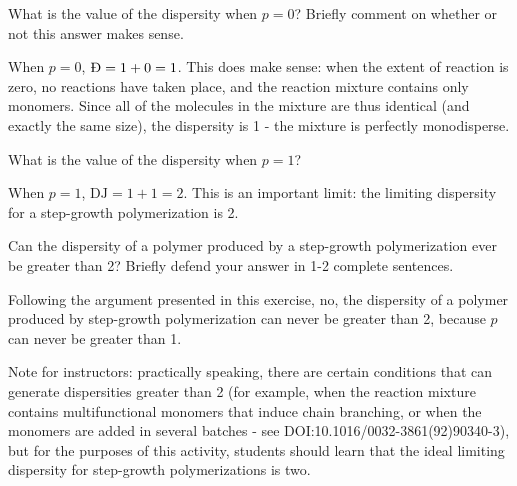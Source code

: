 \begin{activity}
\begin{ctqs}
			
		\question What is the value of the dispersity when $p=0$?  Briefly comment on whether or not this answer makes sense.
		
			\begin{solution}[1.5in]
			
				When $p=0$, $\text{\DJ}=1+0 = 1$.  This does make sense: when the extent of reaction is zero, no reactions have taken place, and the reaction mixture contains only monomers.  Since all of the molecules in the mixture are thus identical (and exactly the same size), the dispersity is 1 - the mixture is perfectly monodisperse.
			
			\end{solution}
			
			
		\question What is the value of the dispersity when $p=1$?
		
			\begin{solution}[1in]
			
				When $p=1$, $\text{DJ}=1+1=2$.  This is an important limit: the limiting dispersity for a step-growth polymerization is 2.
			
			\end{solution}
			
			
			
		\question Can the dispersity of a polymer produced by a step-growth polymerization ever be greater than 2?  Briefly defend your answer in 1-2 complete sentences.
		
			\begin{solution}[1.5in]
			
				Following the argument presented in this exercise, no, the dispersity of a polymer produced by step-growth polymerization can never be greater than 2, because $p$ can never be greater than 1. 
				
				Note for instructors: practically speaking, there are certain conditions that can generate dispersities greater than 2 (for example, when the reaction mixture contains multifunctional monomers that induce chain branching, or when the monomers are added in several batches - see DOI:10.1016/0032-3861(92)90340-3), but for the purposes of this activity, students should learn that the ideal limiting dispersity for step-growth polymerizations is two.
			
			\end{solution}
			
			
\end{ctqs}

\begin{exercises}


\end{exercises}
\end{activity}
